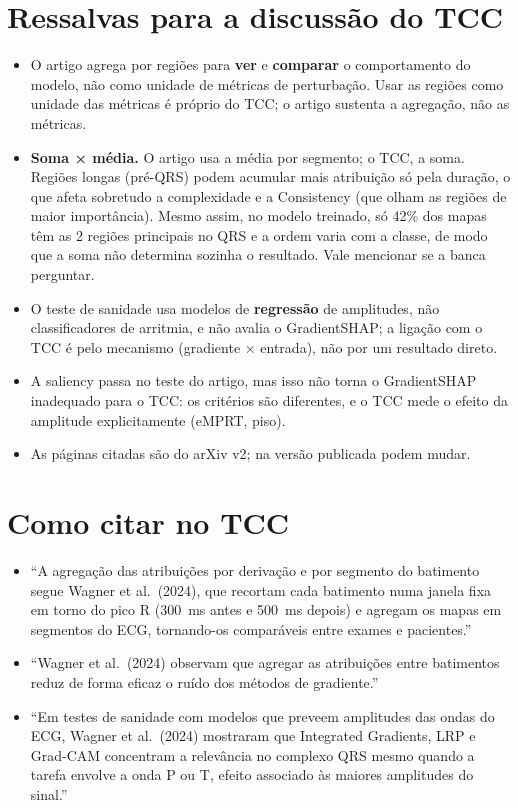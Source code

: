 \documentclass[11pt,a4paper]{article}
\begin{document}
\section{Ressalvas para a discussão do TCC}
\begin{itemize}
\item O artigo agrega por regiões para \textbf{ver} e \textbf{comparar} o comportamento do modelo, não como unidade de métricas de perturbação. Usar as regiões como unidade das métricas é próprio do TCC; o artigo sustenta a agregação, não as métricas.
\item \textbf{Soma × média.} O artigo usa a média por segmento; o TCC, a soma. Regiões longas (pré-QRS) podem acumular mais atribuição só pela duração, o que afeta sobretudo a complexidade e a Consistency (que olham as regiões de maior importância). Mesmo assim, no modelo treinado, só 42\% dos mapas têm as 2 regiões principais no QRS e a ordem varia com a classe, de modo que a soma não determina sozinha o resultado. Vale mencionar se a banca perguntar.
\item O teste de sanidade usa modelos de \textbf{regressão} de amplitudes, não classificadores de arritmia, e não avalia o GradientSHAP; a ligação com o TCC é pelo mecanismo (gradiente × entrada), não por um resultado direto.
\item A saliency passa no teste do artigo, mas isso não torna o GradientSHAP inadequado para o TCC: os critérios são diferentes, e o TCC mede o efeito da amplitude explicitamente (eMPRT, piso).
\item As páginas citadas são do arXiv v2; na versão publicada podem mudar.
\end{itemize}

\section{Como citar no TCC}
\begin{itemize}
\item “A agregação das atribuições por derivação e por segmento do batimento segue Wagner et al.\ (2024), que recortam cada batimento numa janela fixa em torno do pico R (300~ms antes e 500~ms depois) e agregam os mapas em segmentos do ECG, tornando-os comparáveis entre exames e pacientes.”
\item “Wagner et al.\ (2024) observam que agregar as atribuições entre batimentos reduz de forma eficaz o ruído dos métodos de gradiente.”
\item “Em testes de sanidade com modelos que preveem amplitudes das ondas do ECG, Wagner et al.\ (2024) mostraram que Integrated Gradients, LRP e Grad-CAM concentram a relevância no complexo QRS mesmo quando a tarefa envolve a onda P ou T, efeito associado às maiores amplitudes do sinal.”
\end{itemize}
\end{document}
